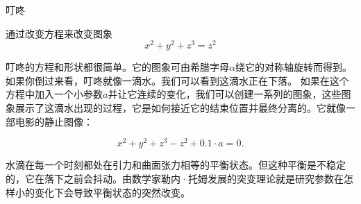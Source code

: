 ﻿\begin{surferPage}{叮咚}

通过改变方程来改变图象\\

\smallskip
\[x^2	+ y^2	+ z^3	= z^2\]

\singlespacing
叮咚的方程和形状都很简单。它的图象可由希腊字母$\alpha$绕它的对称轴旋转而得到。如果你倒过来看，叮咚就像一滴水。我们可以看到这滴水正在下落。
\newline
如果在这个方程中加入一个小参数$a$并让它连续的变化，我们可以创建一系列的图象，这些图象展示了这滴水出现的过程，它是如何接近它的结束位置并最终分离的。它就像一部电影的静止图像：
\smallskip

\[x^2	+ y^2	+ z^3	-z^2+0.1\cdot a=0.\]

\singlespacing
水滴在每一个时刻都处在引力和曲面张力相等的平衡状态。但这种平衡是不稳定的，它在落下之前会抖动。由数学家勒内·托姆发展的突变理论就是研究参数在怎样小的变化下会导致平衡状态的突然改变。
\end{surferPage}
